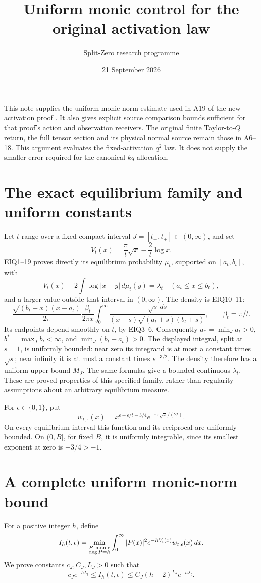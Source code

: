 \documentclass[11pt]{article}
\title{Uniform monic control for the original activation law}
\author{Split-Zero research programme}\date{21 September 2026}
\begin{document}
\maketitle
This note supplies the uniform monic-norm estimate used in A19 of the
new activation proof \cite{Activation}. It also gives explicit source
comparison bounds sufficient for that proof's action and observation
receivers. The original finite Taylor-to-\(Q\) return, the full tensor
section and its physical normal source remain those in A6--18.
This argument evaluates the fixed-activation \(q^2\) law. It does not
supply the smaller error required for the canonical \(kq\) allocation.

\section{The exact equilibrium family and uniform constants}
Let \(t\) range over a fixed compact interval
\(J=[t_-,t_+]\subset(0,\infty)\), and set
\[
V_t(x)=\frac{\pi}{t}\sqrt x-\frac2t\log x.
\]
EIQ1--19 \cite{EIQ} proves directly its equilibrium probability
\(\mu_t\), supported on \([a_t,b_t]\), with
\[
V_t(x)-2\int\log|x-y|\,d\mu_t(y)=\lambda_t
\quad(a_t\le x\le b_t),
\]
and a larger value outside that interval in \((0,\infty)\).
The density is EIQ10--11:
\[
\frac{\sqrt{(b_t-x)(x-a_t)}}{2\pi}
\frac{\beta_t}{2\pi x}
\int_0^\infty
\frac{\sqrt s\,ds}{(x+s)\sqrt{(a_t+s)(b_t+s)}},
\qquad \beta_t=\pi/t.
\]
Its endpoints depend smoothly on \(t\), by EIQ3--6.
Consequently \(a_*=\min_Ja_t>0\),
\(b^*=\max_Jb_t<\infty\), and \(\min_J(b_t-a_t)>0\).
The displayed integral, split at \(s=1\), is uniformly bounded:
near zero its integrand is at most a constant times \(\sqrt s\);
near infinity it is at most a constant times \(s^{-3/2}\).
The density therefore has a uniform upper bound \(M_J\).
The same formulas give a bounded continuous \(\lambda_t\).
These are proved properties of this specified family, rather than
regularity assumptions about an arbitrary equilibrium measure.

For \(\epsilon\in\{0,1\}\), put
\[
w_{t,\epsilon}(x)
=x^{\epsilon+\epsilon/t-3/4}
 e^{-\pi\epsilon\sqrt x/(2t)} .
\]
On every equilibrium interval this function and its reciprocal
are uniformly bounded. On \((0,B]\), for fixed \(B\), it is
uniformly integrable, since its smallest exponent at zero is
\(-3/4>-1\).

\section{A complete uniform monic-norm bound}
For a positive integer \(h\), define
\[
I_h(t,\epsilon)=
\min_{\substack{P\ {\rm monic}\\\deg P=h}}
\int_0^\infty |P(x)|^2e^{-hV_t(x)}w_{t,\epsilon}(x)\,dx.
\]
We prove constants \(c_J,C_J,L_J>0\) such that
\begin{equation}\tag{AP1}
c_Je^{-h\lambda_t}\le I_h(t,\epsilon)
\le C_J(h+2)^{L_J}e^{-h\lambda_t}.
\end{equation}
\end{document}
